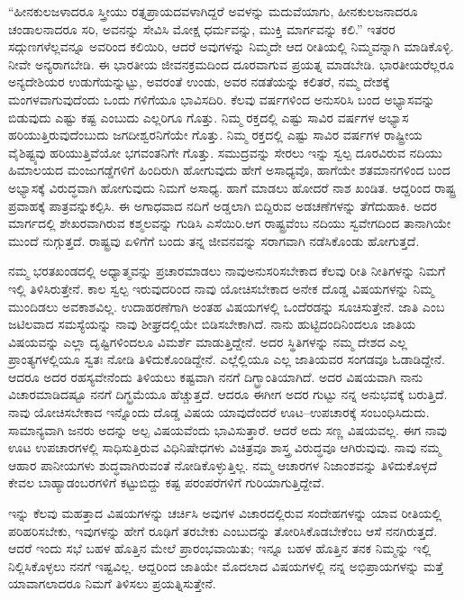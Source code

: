 “ಹೀನಕುಲಜಳಾದರೂ ಸ್ತ್ರೀಯು ರತ್ನಪ್ರಾಯದವಳಾಗಿದ್ದರೆ ಅವಳನ್ನು ಮದುವೆಯಾಗು, ಹೀನಕುಲಜನಾದರೂ ಚಂಡಾಲನಾದರೂ ಸರಿ, ಅವನನ್ನು ಸೇವಿಸಿ ಮೋಕ್ಷ ಧರ್ಮವನ್ನು, ಮುಕ್ತಿ ಮಾರ್ಗವನ್ನು ಕಲಿ.” ಇತರರ ಸದ್ಗುಣಗಳೆಲ್ಲವನ್ನೂ ಅವರಿಂದ ಕಲಿಯಿರಿ, ಆದರೆ ಅವುಗಳನ್ನು ನಿಮ್ಮದೇ ಆದ ರೀತಿಯಲ್ಲಿ ನಿಮ್ಮವನ್ನಾಗಿ ಮಾಡಿಕೊಳ್ಳಿ. ನೀವೇ ಅನ್ಯರಾಗಬೇಡಿ. ಈ ಭಾರತೀಯ ಜೀವನಕ್ರಮದಿಂದ ದೂರವಾಗುವ ಪ್ರಯತ್ನ ಮಾಡಬೇಡಿ. ಭಾರತೀಯರೆಲ್ಲರೂ ಅನ್ಯದೇಶಿಯರ ಉಡುಗೆಯನ್ನುಟ್ಟು, ಅವರಂತೆ ಉಂಡು, ಅವರ ನಡತೆಯನ್ನು ಕಲಿತರೆ, ನಮ್ಮ ದೇಶಕ್ಕೆ ಮಂಗಳವಾಗುವುದೆಂದು ಒಂದು ಗಳಿಗೆಯೂ ಭಾವಿಸದಿರಿ. ಕೆಲವು ವರ್ಷಗಳಿಂದ ಅನುಸರಿಸಿ ಬಂದ ಅಭ್ಯಾಸವನ್ನು ಬಿಡುವುದು ಎಷ್ಟು ಕಷ್ಟ ಎಂಬುದು ಎಲ್ಲರಿಗೂ ಗೊತ್ತು. ನಿಮ್ಮ ರಕ್ತದಲ್ಲಿ ಎಷ್ಟು ಸಾವಿರ ವರ್ಷಗಳ ಅಭ್ಯಾಸ ಹರಿಯುತ್ತಿರುವುದೆಂಬುದು ಜಗದೀಶ್ವರನಿಗೆಯೇ ಗೊತ್ತು. ನಿಮ್ಮ ರಕ್ತದಲ್ಲಿ ಎಷ್ಟು ಸಾವಿರ ವರ್ಷಗಳ ರಾಷ್ಟ್ರೀಯ ವೈಶಿಷ್ಟ್ಯವು ಹರಿಯುತ್ತಿವೆಯೋ ಭಗವಂತನಿಗೇ ಗೊತ್ತು. ಸಮುದ್ರವನ್ನು ಸೇರಲು ಇನ್ನು ಸ್ವಲ್ಪ ದೂರವಿರುವ ನದಿಯು ಹಿಮಾಲಯದ ಮಂಜುಗಡ್ಡೆಗಳಿಗೆ ಹಿಂದಿರುಗಿ ಹೋಗುವುದು ಹೇಗೆ ಅಸಾಧ್ಯವೊ, ಹಾಗೆಯೇ ಶತಮಾನಗಳಿಂದ ಬಂದ ಅಭ್ಯಾಸಕ್ಕೆ ವಿರುದ್ಧವಾಗಿ ಹೋಗುವುದು ನಿಮಗೆ ಅಸಾಧ್ಯ. ಹಾಗೆ ಮಾಡಲು ಹೋದರೆ ನಾಶ ಖಂಡಿತ. ಆದ್ದರಿಂದ ರಾಷ್ಟ್ರ ಪ್ರವಾಹಕ್ಕೆ ಪಾತ್ರವನ್ನು\break ಕಲ್ಪಿಸಿ. ಈ ಅಗಾಧವಾದ ನದಿಗೆ ಅಡ್ಡಲಾಗಿ ಬಿದ್ದಿರುವ ಅಡಚಣೆಗಳನ್ನು ತೆಗೆದು\-ಹಾಕಿ. ಅದರ ಮಾರ್ಗದಲ್ಲಿ ಶೇಖರವಾಗಿರುವ ಕಶ್ಮಲವನ್ನು ಗುಡಿಸಿ ಎಸೆಯಿರಿ.\break ಆಗ ರಾಷ್ಟ್ರವೆಂಬ ನದಿಯು ಸ್ವವೇಗದಿಂದ ತಾನಾಗಿಯೇ ಮುಂದೆ ನುಗ್ಗುತ್ತದೆ. ರಾಷ್ಟ್ರವು ಏಳಿಗೆಗೆ ಬಂದು ತನ್ನ ಜೀವನವನ್ನು ಸರಾಗವಾಗಿ ನಡೆಸಿಕೊಂಡು ಹೋಗುತ್ತದೆ.

ನಮ್ಮ ಭರತಖಂಡದಲ್ಲಿ ಅಧ್ಯಾತ್ಮವನ್ನು ಪ್ರಚಾರಮಾಡಲು ನಾವು\break ಅನುಸರಿಸಬೇಕಾದ ಕೆಲವು ರೀತಿ ನೀತಿಗಳನ್ನು ನಿಮಗೆ ಇಲ್ಲಿ ತಿಳಿಸಿರುತ್ತೇನೆ. ಕಾಲ ಸ್ವಲ್ಪ ಇರುವುದರಿಂದ ನಾವು ಯೋಚಿಸಬೇಕಾದ ಅನೇಕ ದೊಡ್ಡ ವಿಷಯಗಳನ್ನು ನಿಮ್ಮ ಮುಂದಿಡಲು ಅವಕಾಶವಿಲ್ಲ. ಉದಾಹರಣೆಗಾಗಿ ಅಂತಹ ವಿಷಯಗಳಲ್ಲಿ ಒಂದೆರಡನ್ನು ಸೂಚಿಸುತ್ತೇನೆ. ಜಾತಿ ಎಂಬ ಜಟಿಲವಾದ ಸಮಸ್ಯೆಯನ್ನು ನಾವು ಶೀಘ್ರದಲ್ಲಿಯೇ ಬಿಡಿಸಬೇಕಾಗಿದೆ. ನಾನು ಹುಟ್ಟಿದಂದಿನಿಂದಲೂ ಜಾತಿಯ ವಿಷಯವನ್ನು ಎಲ್ಲಾ ದೃಷ್ಟಿಗಳಿಂದಲೂ ವಿಮರ್ಶೆ ಮಾಡುತ್ತಿದ್ದೇನೆ. ಅದರ ಸ್ಥಿತಿಗಳನ್ನು ನಮ್ಮ ದೇಶದ ಎಲ್ಲ ಪ್ರಾಂತ್ಯಗಳಲ್ಲಿಯೂ ಸ್ವತಃ ನೋಡಿ ತಿಳಿದುಕೊಂಡಿದ್ದೇನೆ. ಎಲ್ಲೆಲ್ಲಿಯೂ ಎಲ್ಲ ಜಾತಿಯವರ ಸಂಗಡವೂ ಓಡಾಡಿದ್ದೇನೆ. ಆದರೂ ಅದರ ರಹಸ್ಯವೇನೆಂದು ತಿಳಿಯಲು ಕಷ್ಟವಾಗಿ ನನಗೆ ದಿಗ್ಭ್ರಾಂತಿಯಾಗಿದೆ. ಅದರ ವಿಷಯವಾಗಿ ನಾನು ವಿಚಾರಮಾಡಿದಷ್ಟೂ ನನಗೆ ದಿಗ್ಭ್ರಮೆಯೂ ಹೆಚ್ಚುತ್ತದೆ. ಆದರೂ ಈಗೀಗ ಅದರ ಗುಟ್ಟು ನನ್ನ ಅನುಭವಕ್ಕೆ ಬರುತ್ತಿದೆ. ನಾವು ಯೋಚಿಸಬೇಕಾದ ಇನ್ನೊಂದು ದೊಡ್ಡ ವಿಷಯ ಯಾವುದೆಂದರೆ ಊಟ–ಉಪಚಾರಕ್ಕೆ ಸಂಬಂಧಿಸಿದುದು. ಸಾಮಾನ್ಯವಾಗಿ ಜನರು ಅದನ್ನು ಅಲ್ಪ ವಿಷಯವೆಂದು ಭಾವಿಸುತ್ತಾರೆ. ಆದರೆ ಅದು ಸಣ್ಣ ವಿಷಯವಲ್ಲ. ಈಗ ನಾವು ಊಟ ಉಪಚಾರಗಳಲ್ಲಿ ಸಾಧಿಸುತ್ತಿರುವ ವಿಧಿನಿಷೇಧಗಳು ವಿಚಿತ್ರವೂ ಶಾಸ್ತ್ರ ವಿರುದ್ಧವೂ ಆಗಿರುವುವು. ನಾವು ನಮ್ಮ ಆಹಾರ ಪಾನೀಯಗಳು ಶುದ್ಧವಾಗಿರುವಂತೆ ನೋಡಿಕೊಳ್ಳುತ್ತಿಲ್ಲ. ನಮ್ಮ ಆಚಾರಗಳ ನಿಜಾಂಶವನ್ನು ತಿಳಿದುಕೊಳ್ಳದೆ ಕೇವಲ ಬಾಹ್ಯಾಡಂಬರಗಳಿಗೆ ಕಟ್ಟುಬಿದ್ದು ಕಷ್ಟ ಪರಂಪರೆಗಳಿಗೆ ಗುರಿಯಾಗು\-ತ್ತಿದ್ದೇವೆ.

ಇನ್ನು ಕೆಲವು ಮಹತ್ತಾದ ವಿಷಯಗಳನ್ನು ಚರ್ಚಿಸಿ ಅವುಗಳ ವಿಚಾರದಲ್ಲಿರುವ ಸಂದೇಹಗಳನ್ನು ಯಾವ ರೀತಿಯಲ್ಲಿ ಪರಿಹರಿಸಬೇಕು, ಇವುಗಳನ್ನು ಹೇಗೆ ರೂಢಿಗೆ ತರಬೇಕು ಎಂಬುದನ್ನು ತೋರಿಸಿಕೊಡಬೇಕೆಂಬ ಆಸೆ ನನಗಿರುತ್ತದೆ. ಆದರೆ ಇಂದು ಸಭೆ ಬಹಳ ಹೊತ್ತಿನ ಮೇಲೆ ಪ್ರಾರಂಭವಾಯಿತು; ಇನ್ನೂ ಬಹಳ ಹೊತ್ತಿನ ತನಕ ನಿಮ್ಮನ್ನು ಇಲ್ಲಿ ನಿಲ್ಲಿಸಿಕೊಳ್ಳಲು ನನಗೆ ಇಷ್ಟವಿಲ್ಲ. ಆದ್ದರಿಂದ ಜಾತಿಯೇ ಮೊದಲಾದ ವಿಷಯಗಳಲ್ಲಿ ನನ್ನ ಅಭಿಪ್ರಾಯಗಳನ್ನು ಮತ್ತೆ ಯಾವಾಗಲಾದರೂ ನಿಮಗೆ ತಿಳಿಸಲು ಪ್ರಯತ್ನಿಸುತ್ತೇನೆ.

